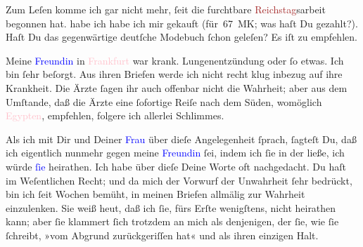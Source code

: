 \pstart
           Zum Leſen komme ich gar nicht mehr, ſeit die furchtbare \textcolor{brown}{Reichstag}{}\ledrightnote{\textcolor{brown}{Reichstag}}sarbeit begonnen hat. \label{K_L03389-6v}\label{K_L03389-6h} habe ich
               habe ich mir gekauft (für 67 \textsc{MK}; was haſt Du gezahlt?).
               Haſt Du das gegenwärtige {\pb}deutſche Modebuch \label{K_L03389-7v}\label{K_L03389-7h} ſchon geleſen?
               Es iſt zu empfehlen.\pend
           
\pstart
           Meine \textcolor{blue}{Freundin}{}\ledrightnote{{$\rightarrow$}\textcolor{blue}{Theodore Rottenberg}} in \textcolor{pink}{Frankfurt}{}\ledrightnote{\textcolor{pink}{Frankfurt am Main}} war krank. Lungenentzündung oder ſo
               etwas. Ich bin ſehr beſorgt. Aus ihren Briefen werde ich nicht recht klug inbezug auf
               ihre Krankheit. Die Ärzte ſagen ihr auch offenbar nicht die Wahrheit; aber aus dem
               Umſtande, daß die Ärzte eine ſofortige Reiſe nach dem Süden, womöglich \textcolor{pink}{Egypten}{}\ledrightnote{\textcolor{pink}{Ägypten}}, empfehlen, folgere ich allerlei
               Schlimmes.\pend
           
\pstart
           Als ich \label{K_L03389-8v}\label{K_L03389-8h} mit Dir und Deiner \textcolor{blue}{Frau}{}\ledrightnote{{$\rightarrow$}\textcolor{blue}{Olga Schnitzler}} über dieſe Angelegenheit ſprach, ſagteſt Du, daß ich eigentlich nunmehr
               gegen  meine \textcolor{blue}{Freundin}{}\ledrightnote{{$\rightarrow$}\textcolor{blue}{Theodore Rottenberg}} ſei, indem ich ſie in {\pb}der \label{K_L03389-9v}\label{K_L03389-9h} ließe, ich würde \textcolor{blue}{ſie}{}\ledrightnote{{$\rightarrow$}\textcolor{blue}{Theodore Rottenberg}}
               heirathen. Ich habe über dieſe Deine Worte oft nachgedacht. \strikeout{\textcolor{gray}{D}} Du haſt im Weſentlichen Recht; und da mich der Vorwurf der Unwahrheit ſehr
               bedrückt, bin ich ſeit Wochen bemüht, in meinen Briefen allmälig zur Wahrheit
               einzulenken. Sie weiß heut, daß ich ſie, fürs Erſte wenigſtens, nicht heirathen kann;
               aber ſie klammert ſich trotzdem an mich als  denjenigen, der ſie, wie ſie ſchreibt, »vom Abgrund zurückgeriſſen hat« und
               als ihren einzigen Halt.\pend
           
